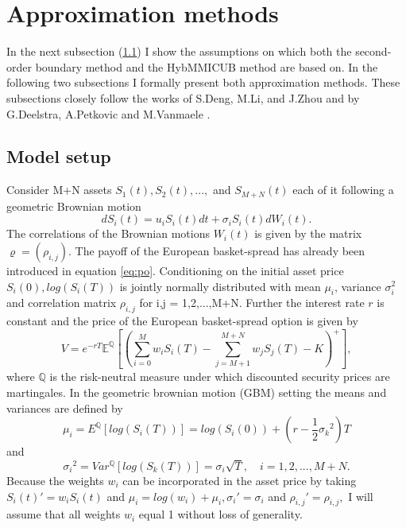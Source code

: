 \documentclass[a4paper]{article}
\begin{document}
\newpage
\section{Approximation methods}
\label{sec:am}
In the next subsection (\ref{sec:ms}) I show the assumptions on which both the second-order boundary method and the HybMMICUB method are based on. In the following two subsections I formally present both approximation methods. These subsections closely follow the works of S.Deng, M.Li, and J.Zhou \cite{sob} and by G.Deelstra, A.Petkovic and M.Vanmaele \cite{hybmmicub}.

\subsection{Model setup}
\label{sec:ms}
Consider M+N assets $S_1(t), S_2(t), ...,$ and $S_{M+N}(t)$ each of it following a geometric Brownian motion
$$dS_i(t) = u_iS_i(t)dt + \sigma_iS_i(t)dW_i(t).$$
The correlations of the Brownian motions $W_i(t)$ is given by the matrix $\varrho=(\rho_{i,j})$. 
The payoff of the European basket-spread has already been introduced in equation \ref{eq:po}. Conditioning on the initial asset price $S_i(0), log(S_i(T))$ is jointly normally distributed with mean $\mu_i$, variance $\sigma_i^2$ and correlation matrix $\rho_{i,j}$ for i,j = 1,2,...,M+N. 
Further the interest rate $r$ is constant and the price of the European basket-spread option is given by
\begin{equation}
\label{eq:mg}
V = e^{-rT}\mathbb{E}^{\mathbb{Q}}[(\sum_{i=0}^M w_iS_i(T) - \sum_{j=M+1}^{M+N} w_jS_j(T) - K)^+],
\end{equation}
where $\mathbb{Q}$ is the risk-neutral measure under which discounted security prices are martingales.
In the geometric brownian motion (GBM) setting the means and variances are defined by 
\begin{equation}
\mu_i = E^\mathbb{Q}[log(S_i(T))] = log(S_i(0)) + (r-\frac{1}{2}{\sigma_k}^2)T
\end{equation}
and
\begin{equation}
{\sigma_i}^2 = Var^\mathbb{Q}[log(S_k(T))] = \sigma_i\sqrt{T}, \quad i=1,2,...,M+N.
\end{equation}
Because the weights $w_i$ can be incorporated in the asset price by taking $S_i(t)'=w_iS_i(t)$ and $\mu_i=log(w_i)+\mu_i, \sigma_i'=\sigma_i$ and $\rho_{i,j}'=\rho_{i,j},$ I will assume that all weights $w_i$ equal 1 without loss of generality.
\end{document}
